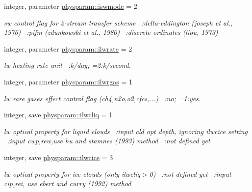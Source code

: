 \begin{DoxyCompactItemize}
integer, parameter \hyperlink{namespacephysparam_afe7d9a3a1e3cd4711675252a0921853b}{physparam\+::iswmode} = 2
\begin{DoxyCompactList}\small\item\em sw control flag for 2-\/stream transfer scheme ~\+:delta-\/eddington (joseph et al., 1976) ~\+:pifm (zdunkowski et al., 1980) ~\+:discrete ordinates (liou, 1973) \end{DoxyCompactList}\item 
integer, parameter \hyperlink{namespacephysparam_a8db5b34f68cb0e3698aa1c200fecd880}{physparam\+::ilwrate} = 2
\begin{DoxyCompactList}\small\item\em lw heating rate unit ~\+:k/day; =2\+:k/second. \end{DoxyCompactList}\item 
integer, parameter \hyperlink{namespacephysparam_a0658ae9417d6c79963e41e7d2a598309}{physparam\+::ilwrgas} = 1
\begin{DoxyCompactList}\small\item\em lw rare gases effect control flag (ch4,n2o,o2,cfcs,...) ~\+:no; =1\+:yes. \end{DoxyCompactList}\item 
integer, save \hyperlink{namespacephysparam_a7301d0d9b48fe408c5e67f2c145fbf7e}{physparam\+::ilwcliq} = 1
\begin{DoxyCompactList}\small\item\em lw optical property for liquid clouds ~\+:input cld opt depth, ignoring ilwcice setting ~\+:input cwp,rew,use hu and stamnes (1993) method ~\+:not defined yet \end{DoxyCompactList}\item 
integer, save \hyperlink{namespacephysparam_acf555c03fdb00286add9c3be7b43c32e}{physparam\+::ilwcice} = 3
\begin{DoxyCompactList}\small\item\em lw optical property for ice clouds (only ilwcliq$>$0) ~\+:not defined yet ~\+:input cip,rei, use ebert and curry (1992) method ~\newline

\end{DoxyCompactList}
\end{DoxyCompactItemize}
